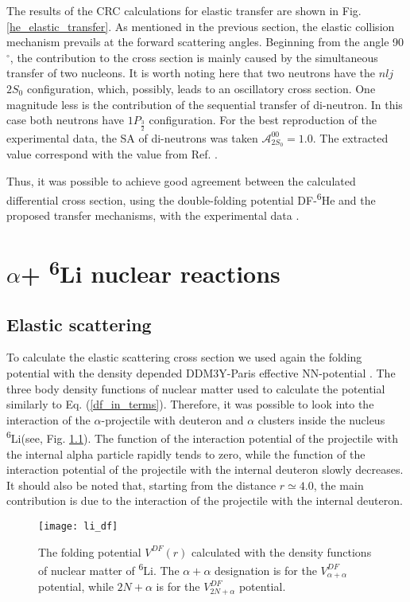 \documentclass[
12pt, %
oneside, %
english, %
doublespacing, %
doublespacing, %
toctotoc, %
parskip, %
headsepline, %
]{MastersDoctoralThesis} %
\newcommand{\he}{\textsuperscript{6}He\xspace}
\newcommand{\li}{\textsuperscript{6}Li\xspace}
\begin{document}
The results of the CRC calculations for elastic transfer are shown in Fig. \ref{he_elastic_transfer}.  
As mentioned in the previous section, the elastic collision mechanism prevails at the forward scattering angles. 
Beginning from the angle 90$^\circ$, the contribution to the cross section is mainly caused by the simultaneous transfer of two nucleons.
 It is worth noting here that two neutrons have the $nlj$ $2S_0$ configuration, which, possibly, leads to an oscillatory cross section. One magnitude less is the contribution of the sequential transfer of di-neutron. 
 In this case both neutrons have $1P_{\frac{3}{2}}$ configuration. 
 For the best reproduction of the experimental data, the SA of di-neutrons was taken  $\mathcal{A}^{00}_{2S_0}=1.0$. 
 The extracted value correspond with the value from Ref. \cite{khoa2004di, oganessian1999dynamics}.

Thus, it was possible to achieve good agreement between the calculated differential cross section, using the double-folding potential DF-\he and the proposed transfer mechanisms, with the experimental data \cite{oganessian1999dynamics}.


\chapter{$\alpha$+ \li  nuclear reactions }
\section{Elastic scattering}

To calculate the elastic scattering cross section we used again the folding potential with the density depended DDM3Y-Paris effective NN-potential \cite{anantaraman1983effective}. The three body density functions of nuclear matter used to calculate the potential similarly to Eq. (\ref{df_in_terms}). Therefore, it was possible to look into the interaction of the $\alpha$-projectile with deuteron and $\alpha$ clusters inside the nucleus \li (see, Fig. \ref{li_df}). The function of the interaction potential of the projectile with the internal alpha particle rapidly tends to zero, while the function of the interaction potential of the projectile with the internal deuteron slowly decreases. It should also be noted that, starting from the distance $r \simeq 4.0$, the main contribution is due to the interaction of the projectile with the internal deuteron.

 \begin{figure}
\centering
\texttt{[image: li\_df]}
\decoRule
\caption{    The folding potential $V^{DF}(r)$ calculated with the density functions of nuclear matter of \li. The $\alpha+\alpha$ designation is for the $V_{\alpha+\alpha}^{DF}$ potential, while $2N + \alpha$ is for the  $V_{2N+\alpha}^{DF}$ potential.
}
\label{li_df}
\end{figure}
\end{document}
